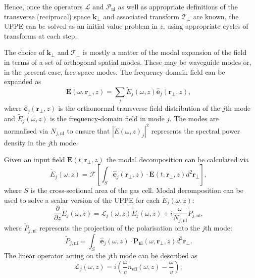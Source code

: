 \documentclass[a4paper]{jpconf}
\begin{document}
Hence, once the operators $\mathcal{L}$ and $\mathcal{P}_\text{nl}$ as well as appropriate definitions of the transverse (reciprocal) space $\mathbf{k}_\perp$ and associated transform $\mathcal{T}_\perp$ are known, the UPPE can be solved as an initial value problem in $z$, using appropriate cycles of transforms at each step. \par 
The choice of $\mathbf{k}_\perp$ and $\mathcal{T}_\perp$ is mostly a matter of the modal expansion of the field in terms of a set of orthogonal spatial modes. These may be waveguide modes or, in the present case, free space modes. The frequency-domain field can be expanded as 
\begin{equation}
\mathbf{E}(\omega, \mathbf{r}_\perp, z) = \sum_j \tilde{E}_j (\omega,z)  \hat{\mathbf{e}}_j (\mathbf{r}_\perp, z),
\end{equation}
where $\hat{\mathbf{e}}_j (\mathbf{r}_\perp, z)$ is the orthonormal transverse field distribution of the $j$th mode and $\tilde{E}_j (\omega,z)$ is the frequency-domain field in mode $j$. The modes are normalised via $N_{j, \text{nl}}$ to ensure that $|\tilde{E}(\omega,z)_j|^2$ represents the spectral power density in the $j$th mode. \par 
Given an input field $\mathbf{E}(t, \mathbf{r}_\perp, z)$ the modal decomposition can be calculated via 
\begin{equation}
\tilde{E}_j (\omega,z) = \mathcal{F}\left[ \int_S \hat{\mathbf{e}}_j(\mathbf{r}_\perp,z) \cdot \mathbf{E}(t, \mathbf{r}_\perp, z) d^2 \mathbf{r}_\perp \right],
\end{equation}
where $S$ is the cross-sectional area of the gas cell. Modal decomposition can be used to solve  a scalar version of the UPPE for each $\tilde{E}_j(\omega,z)$:
\begin{equation}
\frac{\partial}{\partial z} \tilde{E}_j(\omega,z) = \mathcal{L}_j (\omega,z) \tilde{E}_j(\omega,z)+ i\frac{\omega}{N_{j, \text{nl}}} \tilde{P}_{j,\text{nl}},
\end{equation}
where $\tilde{P}_{j,\text{nl}}$ represents the projection of the polarisation onto the $j$th mode:
\begin{equation}
\tilde{P}_{j, \text{nl}} = \int_S \hat{\mathbf{e}}_j(\omega,z) \cdot \mathbf{P}_{\text{nl}}(\omega, \mathbf{r}_\perp, z) d^2 \mathbf{r}_\perp.
\end{equation}
The linear operator acting on the $j$th mode can be described as 
\begin{equation}
\mathcal{L}_j(\omega, z) = i \left( \frac{\omega}{c} n_{\text{eff}}(\omega,z) - \frac{\omega}{v} \right),
\end{equation}
\end{document}

